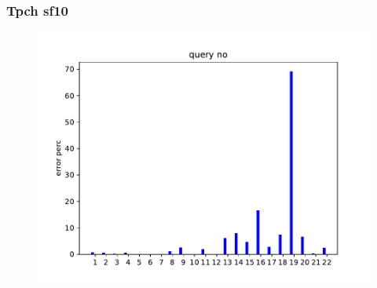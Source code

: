\begin{frame}[fragile]
	\frametitle{Tpch sf10}
  \begin{figure}[t]
    \centering
    \includegraphics[width=1.0\textwidth]{../figs/tpch10/mem_error_1-23.pdf}
  \end{figure}
\end{frame}
